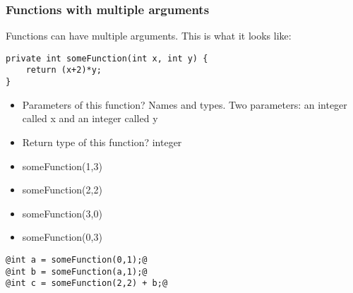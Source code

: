 \documentclass{beamer}
\begin{document}
\begin{frame}[fragile]
\frametitle{Functions with multiple arguments}
Functions can have multiple arguments. This is what it looks like:
\pause
\begin{lstlisting}
private int someFunction(int x, int y) {
    return (x+2)*y;
}
\end{lstlisting}
\pause
\begin{itemize}
\item Parameters of this function? Names and types. \pause \newline Two parameters: \pause an integer called x and an integer called y
\pause
\item Return type of this function? \pause \newline integer
\end{itemize}
\pause
\begin{itemize}
\pause
\item someFunction(1,3)
\pause
\item someFunction(2,2)
\pause
\item someFunction(3,0)
\pause
\item someFunction(0,3)
\end{itemize}
\pause
\begin{lstlisting}[style=base]
@int a = someFunction(0,1);@
@int b = someFunction(a,1);@
@int c = someFunction(2,2) + b;@
\end{lstlisting}
\end{frame}
\end{document}
